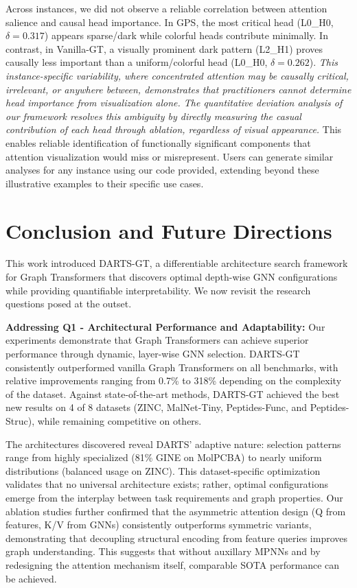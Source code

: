 \documentclass[lettersize,journal]{IEEEtran}
\begin{document}
Across instances, we did not observe a reliable correlation between attention salience and causal head importance. In GPS, the most critical head (L0\_H0, $\delta=0.317$) appears sparse/dark while colorful heads contribute minimally. In contrast, in Vanilla-GT, a visually prominent dark pattern (L2\_H1) proves causally less important than a uniform/colorful head (L0\_H0,  $\delta=0.262$). \textit{This instance-specific variability, where concentrated attention may be causally critical, irrelevant, or anywhere between, demonstrates that practitioners cannot determine head importance from visualization alone. The quantitative deviation analysis of our framework resolves this ambiguity by directly measuring the casual contribution of each head through ablation, regardless of visual appearance.} This enables reliable identification of functionally significant components that attention visualization would miss or misrepresent. Users can generate similar analyses for any instance using our code provided, extending beyond these illustrative examples to their specific use cases.



\section{Conclusion and Future Directions}

This work introduced DARTS-GT, a differentiable architecture search framework for Graph Transformers that discovers optimal depth-wise GNN configurations while providing quantifiable interpretability. We now revisit the research questions posed at the outset.

\textbf{Addressing Q1 - Architectural Performance and Adaptability:} Our experiments demonstrate that Graph Transformers can achieve superior performance through dynamic, layer-wise GNN selection. DARTS-GT consistently outperformed vanilla Graph Transformers on all benchmarks, with relative improvements ranging from 0.7\% to 318\% depending on the complexity of the dataset. Against state-of-the-art methods, DARTS-GT achieved the best new results on 4 of 8 datasets (ZINC, MalNet-Tiny, Peptides-Func, and Peptides-Struc), while remaining competitive on others. 

The architectures discovered reveal DARTS' adaptive nature: selection patterns range from highly specialized (81\% GINE on MolPCBA) to nearly uniform distributions (balanced usage on ZINC). This dataset-specific optimization validates that no universal architecture exists; rather, optimal configurations emerge from the interplay between task requirements and graph properties. Our ablation studies further confirmed that the asymmetric attention design (Q from features, K/V from GNNs) consistently outperforms symmetric variants, demonstrating that decoupling structural encoding from feature queries improves graph understanding. This suggests that without auxillary MPNNs and by redesigning the attention mechanism itself, comparable SOTA performance can be achieved.
\end{document}
